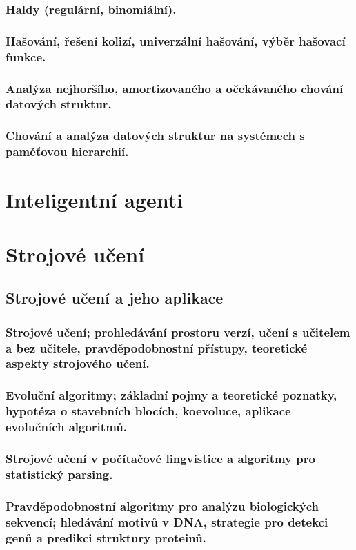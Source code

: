 \documentclass[11pt]{report} %
\begin{document}
\section{Haldy (regulární, binomiální).}
\section{Hašování, řešení kolizí, univerzální hašování, výběr hašovací funkce.}
\section{Analýza nejhoršího, amortizovaného a očekávaného chování datových struktur.}
\section{Chování a analýza datových struktur na systémech s paměťovou hierarchií.}



\part{Inteligentní agenti}



\part{Strojové učení}
\chapter{Strojové učení a jeho aplikace}
\section{Strojové učení; prohledávání prostoru verzí, učení s učitelem a bez učitele, pravděpodobnostní přístupy, teoretické aspekty strojového učení.}
\section{Evoluční algoritmy; základní pojmy a teoretické poznatky, hypotéza o stavebních blocích, koevoluce, aplikace evolučních algoritmů.}
\section{Strojové učení v počítačové lingvistice a algoritmy pro statistický parsing.}
\section{Pravděpodobnostní algoritmy pro analýzu biologických sekvencí; hledávání motivů v DNA, strategie pro detekci genů a predikci struktury proteinů.}
\end{document}

